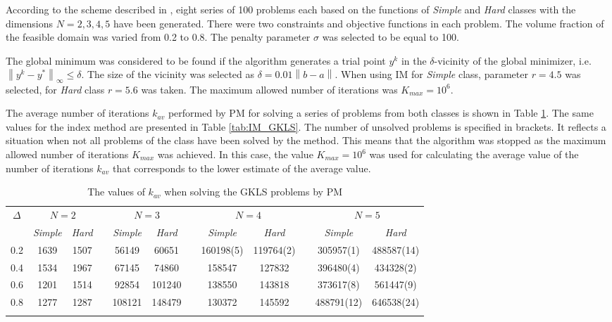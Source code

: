 \documentclass{llncs}
\begin{document}
According to the scheme described in \cite{GergelLION}, eight series of 100 problems each based on the functions of \textit{Simple} and \textit{Hard} classes with the dimensions $N = 2, 3, 4, 5$ have been generated. There were two constraints and objective functions in each problem. The volume fraction of the feasible domain was varied from 0.2 to 0.8. The penalty parameter $\sigma$ was selected to be equal to 100. 

The global minimum was considered to be found if the algorithm generates a trial point $y^k$ in the $\delta$-vicinity of the global minimizer, i.e. $\left\|y^k-y^\ast\right\|_\infty\leq\delta$. The size of the vicinity was selected as $\delta = 0.01\left\|b-a\right\|$. When using IM for \textit{Simple} class, parameter $r = 4.5$ was selected, for \textit{Hard} class $r = 5.6$ was taken. The maximum allowed number of iterations was $K_{max} = 10^6$. 


The average number of iterations $k_{av}$ performed by PM for solving a series of problems from both classes is shown in Table \ref{tab:PM_GKLS}. The same values for the index method are presented in Table \ref{tab:IM_GKLS}. The number of unsolved problems is specified in brackets. It reflects a situation when not all problems of the class have been solved by the method. This means that the algorithm was stopped as the maximum allowed number of iterations $K_{max}$ was achieved. In this case, the value $K_{max}=10^6$ was used for calculating the average value of the number of iterations $k_{av}$ that corresponds to the lower estimate of the average value. 


\begin{table}
	\caption{The values of $k_{av}$ when solving the GKLS problems by PM}
	\label{tab:PM_GKLS}
	\center
	\begin{tabular}{cccccccccccc}
		\hline\noalign{\smallskip}
		$\Delta$ & \multicolumn{2}{c}{ $N=2$ } & & \multicolumn{2}{c}{$N=3$} & & \multicolumn{2}{c}{$N=4$} & & \multicolumn{2}{c}{$N=5$}  \\
		\noalign{\smallskip} \cline{2-3} \cline{5-6} \cline{8-9} \cline{11-12} \noalign{\smallskip}
		 & \textit{Simple} & \textit{Hard} & & \textit{Simple} & \textit{Hard} & & \textit{Simple} & \textit{Hard} & & \textit{Simple} & \textit{Hard}  \\
		\noalign{\smallskip} \hline \noalign{\smallskip}
		0.2 &	1639 &	1507 & &	56149 &	60651 & & 160198(5) &	119764(2) & &	305957(1) &	488587(14) \\ 			
		0.4 & 1534 &	1967 & &	67145 &	74860 & &	158547 &	127832 & &	396480(4) &	434328(2) \\
		0.6 & 1201 &	1514 & &	92854 &	101240 & &	138550 &	143818 & &	373617(8) &	561447(9) \\
		0.8 & 1277 &	1287 & &	108121& 148479 & &	130372 &	145592 & &	488791(12) &	646538(24)\\
		\noalign{\smallskip}\hline
	\end{tabular}
\end{table}
\end{document}
